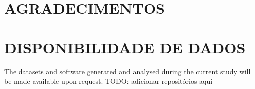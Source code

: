 \documentclass{IEEEphot}
\begin{document}
\section*{AGRADECIMENTOS}


\section*{DISPONIBILIDADE DE DADOS}
The datasets and software generated and analysed during the current study will be made available upon request. TODO: adicionar repositórios aqui




\vfill\pagebreak
\end{document}
